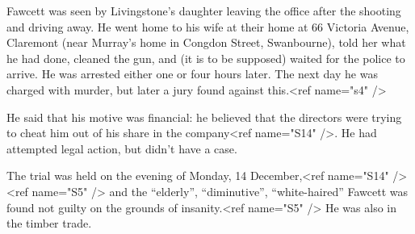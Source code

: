 Fawcett was seen by Livingstone's daughter\cite{FawcettRemanded} leaving the office after the shooting and driving away.
He went home to his wife at their home at 66 Victoria Avenue, Claremont
(near Murray's home in Congdon Street, Swanbourne)\cite{FawcettRemanded},
told her what he had done, cleaned the gun, and (it is to be supposed) waited for the police to arrive.\cite{DoubleMurder}
He was arrested either one\cite{TheAge1935} or four\cite{SMHDoubleMurder} hours later.
The next day he was charged with murder,\cite{SMHDoubleMurder} but later a jury found against this.<ref name="s4" />

He said that his motive was financial:
he believed that the directors were trying to cheat him out of his share in the company\cite{DoubleMurder}<ref name="S14" />.
He had attempted legal action, but didn't have a case.\cite{DoubleMurder}

The trial was held on the evening of Monday, 14 December,<ref name="S14" /><ref name="S5" />
and the ``elderly'', ``diminutive'', ``white-haired''\cite{NewAngle} Fawcett was
found not guilty on the grounds of insanity.<ref name="S5" />
He was also in the timber trade.\cite{FawcettRemanded}
